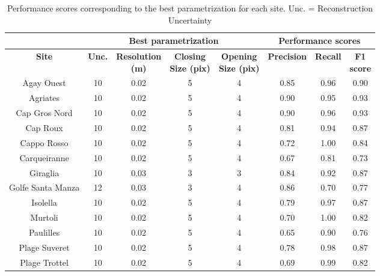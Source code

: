 \begin{table}[H]
  \centering
  \normalsize
  \caption[Performance scores corresponding to the best parametrization for each site.]{Performance scores corresponding to the best parametrization for each site. Unc. = Reconstruction Uncertainty}
  \label{table3.2}
    \begin{tabular}{*{1}{c}|*{4}{c}|*{3}{c}}
        \toprule
        \textbf{} & \multicolumn{4}{c}{\textbf{Best parametrization}} & \multicolumn{3}{c}{\textbf{Performance scores}} \\ 
        \midrule
        \textbf{Site} & \textbf{Unc.} & \makecell{\textbf{Resolution} \\ \textbf{(m)}} & \makecell{\textbf{Closing} \\ \textbf{Size (pix)}} & \makecell{\textbf{Opening} \\ \textbf{Size (pix)}} & \textbf{Precision} & \textbf{Recall} & \makecell{\textbf{F1} \\ \textbf{score}} \\
        \midrule
        Agay Ouest & 10 & 0.02 & 5 & 4 & 0.85 & 0.96 & 0.90 \\
        Agriates & 10 & 0.02 & 5 & 4 & 0.90 & 0.95 & 0.93 \\
        Cap Gros Nord & 10 & 0.02 & 5 & 4 & 0.90 & 0.96 & 0.93 \\
        Cap Roux & 10 & 0.02 & 5 & 4 & 0.81 & 0.94 & 0.87 \\
        Cappo Rosso & 10 & 0.02 & 5 & 4 & 0.72 & 1.00 & 0.84 \\
        Carqueiranne & 10 & 0.02 & 5 & 4 & 0.67 & 0.81 & 0.73 \\
        Giraglia & 10 & 0.03 & 3 & 3 & 0.84 & 0.92 & 0.87 \\
        Golfe Santa Manza & 12 & 0.03 & 3 & 4 & 0.86 & 0.70 & 0.77 \\
        Isolella & 10 & 0.02 & 5 & 4 & 0.79 & 0.97 & 0.87 \\
        Murtoli & 10 & 0.02 & 5 & 4 & 0.70 & 1.00 & 0.82 \\
        Paulilles & 10 & 0.02 & 5 & 4 & 0.65 & 0.90 & 0.76 \\
        Plage Suveret & 10 & 0.02 & 5 & 4 & 0.78 & 0.98 & 0.87 \\
        Plage Trottel & 10 & 0.02 & 5 & 4 & 0.69 & 0.99 & 0.82 \\

\end{tabular}
\end{table}
